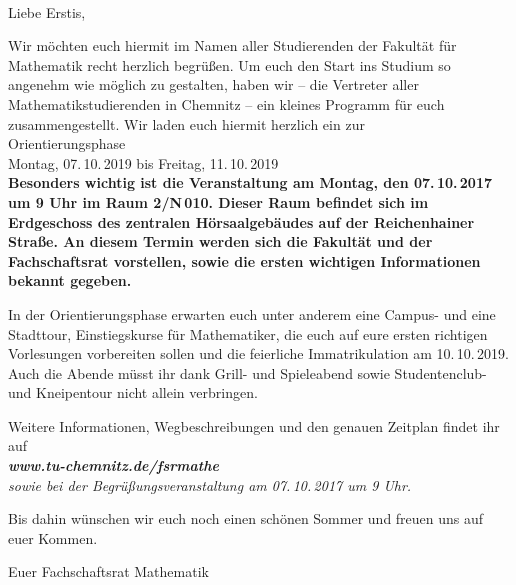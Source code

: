\documentclass[nkz,einrichtung,usemycontact]{tucletter2019}
\begin{document}
	
\begin{letter}{%
\, \\
}

\opening{Liebe Erstis,}


Wir möchten euch hiermit im Namen aller Studierenden der Fakultät für Mathematik recht herzlich begrüßen.
Um euch den Start ins Studium so angenehm wie möglich zu gestalten, haben wir -- die Vertreter aller Mathematikstudierenden in Chemnitz -- ein
kleines Programm für euch zusammengestellt. Wir laden euch hiermit herzlich ein zur \\[16pt]

\hspace*{\fill} \Large Orientierungsphase \hspace*{\fill} \\
\hspace*{\fill} Montag, 07.\,10.\,2019 bis Freitag, 11.\,10.\,2019 \normalsize \hspace*{\fill} \\[20pt]


\bfseries Besonders wichtig ist die Veranstaltung am Montag, den 07.\,10.\,2017 um 9 Uhr im Raum 2/N\,010. Dieser Raum befindet sich im Erdgeschoss 
des zentralen Hörsaalgebäudes auf der Reichenhainer Straße. An diesem Termin werden sich die Fakultät und der Fachschaftsrat vorstellen, sowie 
die ersten wichtigen Informationen bekannt gegeben.\mdseries

\medskip

In der Orientierungsphase erwarten euch unter anderem eine Campus- und eine Stadttour, Einstiegskurse für Mathematiker, die euch auf eure ersten richtigen Vorlesungen vorbereiten sollen und die feierliche Immatrikulation am 10.\,10.\,2019. Auch die Abende müsst ihr dank Grill- und Spieleabend sowie Studentenclub- und Kneipentour nicht allein verbringen.

\medskip

Weitere Informationen, Wegbeschreibungen und den genauen Zeitplan findet ihr auf\\[8pt]
\hspace*{\fill} \itshape\textbf{www.tu-chemnitz.de/fsrmathe} \upshape \hspace*{\fill} \\[8pt]
sowie bei der Begrüßungsveranstaltung am 07.\,10.\,2017 um 9 Uhr.

\bigskip

Bis dahin wünschen wir euch noch einen schönen Sommer und freuen uns auf euer Kommen.

\bigskip

Euer Fachschaftsrat Mathematik

\end{letter}
\end{document}
